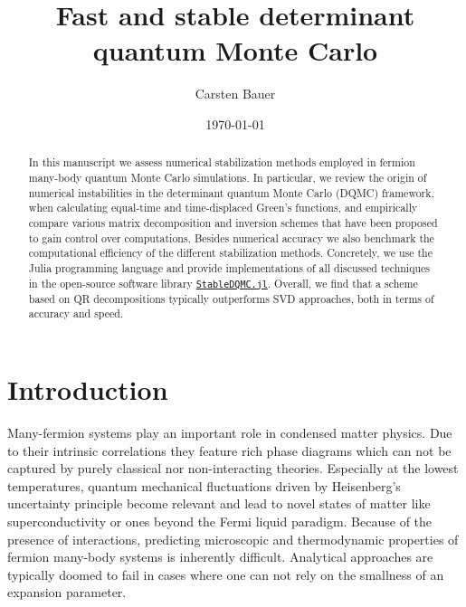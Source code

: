 \documentclass[%
 reprint,
superscriptaddress,
citeautoscript,
showpacs,
 amsmath,amssymb,
 aps,
 prb,
longbibliography,
]{revtex4-2}
\begin{document}
\title{Fast and stable determinant quantum Monte Carlo}%

\author{Carsten Bauer}

\date{\today}%

\begin{abstract}
In this manuscript we assess numerical stabilization methods employed in fermion many-body quantum Monte Carlo simulations. In particular, we review the origin of numerical instabilities in the determinant quantum Monte Carlo (DQMC) framework, when calculating equal-time and time-displaced Green's functions, and empirically compare various matrix decomposition and inversion schemes that have been proposed to gain control over computations. Besides numerical accuracy we also benchmark the computational efficiency of the different stabilization methods. Concretely, we use the Julia programming language and provide implementations of all discussed techniques in the open-source software library \href{http://github.com/crstnbr/StableDQMC.jl}{\texttt{StableDQMC.jl}}. Overall, we find that a scheme based on QR decompositions typically outperforms SVD approaches, both in terms of accuracy and speed.
\end{abstract}


\maketitle


\section{Introduction}


Many-fermion systems play an important role in condensed matter physics. Due to their intrinsic correlations they feature rich phase diagrams which can not be captured by purely classical nor non-interacting theories. Especially at the lowest temperatures, quantum mechanical fluctuations driven by Heisenberg's uncertainty principle become relevant and lead to novel states of matter like superconductivity or ones beyond the Fermi liquid paradigm. Because of the presence of interactions, predicting microscopic and thermodynamic properties of fermion many-body systems is inherently difficult. Analytical approaches are typically doomed to fail in cases where one can not rely on the smallness of an expansion parameter.
\end{document}
